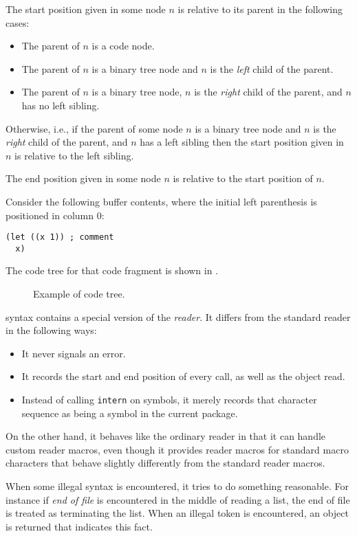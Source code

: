 The start position given in some node $n$ is relative to its parent in
the following cases:

\begin{itemize}
\item The parent of $n$ is a code node.
\item The parent of $n$ is a binary tree node and $n$ is the
  \emph{left} child of the parent.
\item The parent of $n$ is a binary tree node, $n$ is the
  \emph{right} child of the parent, and $n$ has no left sibling.
\end{itemize}

Otherwise, i.e., if the parent of some node $n$ is a binary tree node
and $n$ is the \emph{right} child of the parent, and $n$ has a left
sibling then the start position given in $n$ is relative to the left
sibling.

The end position given in some node $n$ is relative to the start
position of $n$.

Consider the following buffer contents, where the initial left
parenthesis is positioned in column $0$:

\begin{verbatim}
(let ((x 1)) ; comment
  x)
\end{verbatim}

The code tree for that code fragment is shown in .

\begin{figure}
\begin{center}
\end{center}
\caption{\label{fig-code-tree}
Example of code tree.}
\end{figure}

\commonlisp{} syntax contains a special version of the \commonlisp{}
\emph{reader}.  It differs from the standard reader in the following
ways:

\begin{itemize}
\item It never signals an error.
\item It records the start and end position of every call, as well as
  the object read.
\item Instead of calling \texttt{intern} on symbols, it merely records
  that character sequence as being a symbol in the current package. 
\end{itemize}

On the other hand, it behaves like the ordinary \commonlisp{} reader
in that it can handle custom reader macros, even though it provides
reader macros for standard macro characters that behave slightly
differently from the standard reader macros.

When some illegal syntax is encountered, it tries to do something
reasonable.  For instance if \emph{end of file} is encountered in the
middle of reading a list, the end of file is treated as terminating
the list.  When an illegal token is encountered, an object is returned
that indicates this fact. 


